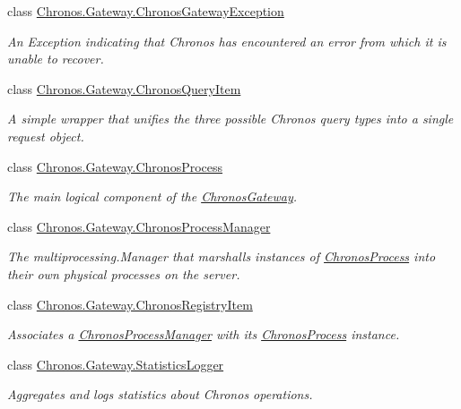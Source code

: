\begin{DoxyCompactItemize}
class \hyperlink{classChronos_1_1Gateway_1_1ChronosGatewayException}{Chronos.\+Gateway.\+Chronos\+Gateway\+Exception}
\begin{DoxyCompactList}\small\item\em An Exception indicating that Chronos has encountered an error from which it is unable to recover. \end{DoxyCompactList}\item 
class \hyperlink{classChronos_1_1Gateway_1_1ChronosQueryItem}{Chronos.\+Gateway.\+Chronos\+Query\+Item}
\begin{DoxyCompactList}\small\item\em A simple wrapper that unifies the three possible Chronos query types into a single request object. \end{DoxyCompactList}\item 
class \hyperlink{classChronos_1_1Gateway_1_1ChronosProcess}{Chronos.\+Gateway.\+Chronos\+Process}
\begin{DoxyCompactList}\small\item\em The main logical component of the \hyperlink{classChronos_1_1Gateway_1_1ChronosGateway}{Chronos\+Gateway}. \end{DoxyCompactList}\item 
class \hyperlink{classChronos_1_1Gateway_1_1ChronosProcessManager}{Chronos.\+Gateway.\+Chronos\+Process\+Manager}
\begin{DoxyCompactList}\small\item\em The multiprocessing.\+Manager that marshalls instances of \hyperlink{classChronos_1_1Gateway_1_1ChronosProcess}{Chronos\+Process} into their own physical processes on the server. \end{DoxyCompactList}\item 
class \hyperlink{classChronos_1_1Gateway_1_1ChronosRegistryItem}{Chronos.\+Gateway.\+Chronos\+Registry\+Item}
\begin{DoxyCompactList}\small\item\em Associates a \hyperlink{classChronos_1_1Gateway_1_1ChronosProcessManager}{Chronos\+Process\+Manager} with its \hyperlink{classChronos_1_1Gateway_1_1ChronosProcess}{Chronos\+Process} instance. \end{DoxyCompactList}\item 
class \hyperlink{classChronos_1_1Gateway_1_1StatisticsLogger}{Chronos.\+Gateway.\+Statistics\+Logger}
\begin{DoxyCompactList}\small\item\em Aggregates and logs statistics about Chronos operations. \end{DoxyCompactList}\item 

\end{DoxyCompactItemize}
